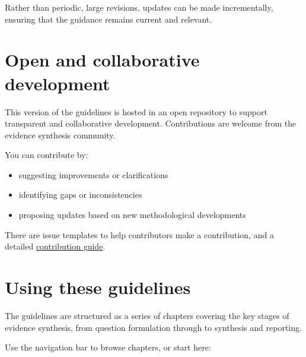 \documentclass[
  letterpaper,
  DIV=11,
  numbers=noendperiod]{scrreprt}
\providecommand{\tightlist}{%
  \setlength{\itemsep}{0pt}\setlength{\parskip}{0pt}}
\begin{document}
Rather than periodic, large revisions, updates can be made
incrementally, ensuring that the guidance remains current and relevant.

\section*{Open and collaborative
development}\label{open-and-collaborative-development}


This version of the guidelines is hosted in an open repository to
support transparent and collaborative development. Contributions are
welcome from the evidence synthesis community.

You can contribute by:

\begin{itemize}
\tightlist
\item
  suggesting improvements or clarifications\\
\item
  identifying gaps or inconsistencies\\
\item
  proposing updates based on new methodological developments
\end{itemize}

There are issue templates to help contributors make a contribution, and
a detailed
\href{https://github.com/CollaborationEnvironmentalEvidence/CEE_guidelines/blob/main/contribution.md}{contribution
guide}.

\section*{Using these guidelines}\label{using-these-guidelines}


The guidelines are structured as a series of chapters covering the key
stages of evidence synthesis, from question formulation through to
synthesis and reporting.

Use the navigation bar to browse chapters, or start here:
\end{document}
